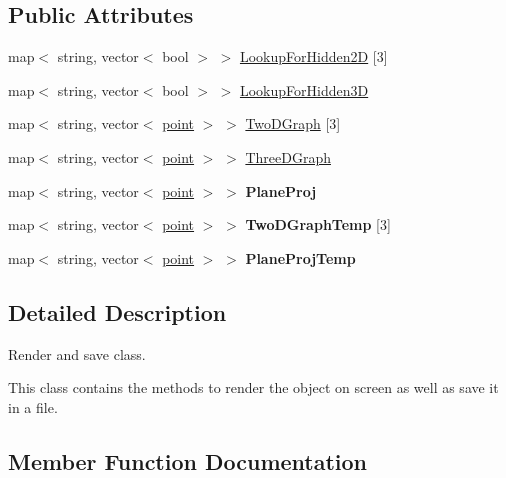 \subsection*{Public Attributes}
\begin{DoxyCompactItemize}
\item 
map$<$ string, vector$<$ bool $>$ $>$ \hyperlink{classOutput_a09326f8ecea28b8fafce2903753d508f}{Lookup\+For\+Hidden2D} \mbox{[}3\mbox{]}
\item 
map$<$ string, vector$<$ bool $>$ $>$ \hyperlink{classOutput_a0efdf7e2ffdd5375d925c1d41784e365}{Lookup\+For\+Hidden3D}
\item 
map$<$ string, vector$<$ \hyperlink{structpoint}{point} $>$ $>$ \hyperlink{classOutput_a24397893b0741447fdc351e5f66c2bfc}{Two\+D\+Graph} \mbox{[}3\mbox{]}
\item 
map$<$ string, vector$<$ \hyperlink{structpoint}{point} $>$ $>$ \hyperlink{classOutput_aae5a299ccc1830950c8e03cfe7863a4f}{Three\+D\+Graph}
\item 
map$<$ string, vector$<$ \hyperlink{structpoint}{point} $>$ $>$ {\bfseries Plane\+Proj}\hypertarget{classOutput_aecfac036be1c7e637a4be478604ba0dc}{}\label{classOutput_aecfac036be1c7e637a4be478604ba0dc}

\item 
map$<$ string, vector$<$ \hyperlink{structpoint}{point} $>$ $>$ {\bfseries Two\+D\+Graph\+Temp} \mbox{[}3\mbox{]}\hypertarget{classOutput_ab587641cf5674d83b02cf175c932e830}{}\label{classOutput_ab587641cf5674d83b02cf175c932e830}

\item 
map$<$ string, vector$<$ \hyperlink{structpoint}{point} $>$ $>$ {\bfseries Plane\+Proj\+Temp}\hypertarget{classOutput_aeab59c1c4e1e81f9df44657288561e99}{}\label{classOutput_aeab59c1c4e1e81f9df44657288561e99}

\end{DoxyCompactItemize}


\subsection{Detailed Description}
Render and save class. 

This class contains the methods to render the object on screen as well as save it in a file. 

\subsection{Member Function Documentation}

